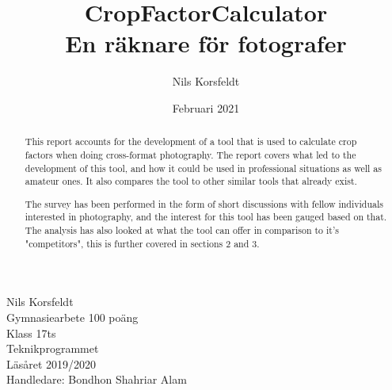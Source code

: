 \documentclass[11pt]{article}
\title{%
        CropFactorCalculator\\
        \large En räknare för fotografer}
\author{Nils Korsfeldt}
\date{Februari 2021}
\begin{document}
\maketitle

{\raggedleft\vfill{%
    Nils Korsfeldt \\ 
    Gymnasiearbete 100 poäng \\
    Klass 17ts \\
    Teknikprogrammet \\
    Läsåret 2019/2020 \\
    Handledare: Bondhon Shahriar Alam
}\par
}

\clearpage

\begin{abstract}
\normalsize

This report accounts for the development of a tool that is used to calculate
crop factors when doing cross-format photography. The report covers what led to
the development of this tool, and how it could be used in professional
situations as well as amateur ones. It also compares the tool to other similar
tools that already exist.\par
\bigskip

The survey has been performed in the form of short discussions with fellow
individuals interested in photography, and the interest for this tool has been 
gauged based on that. The analysis has also looked at what the tool can offer
in comparison to it's "competitors", this is further covered in
sections 2 and 3.

\end{abstract}
\end{document}
